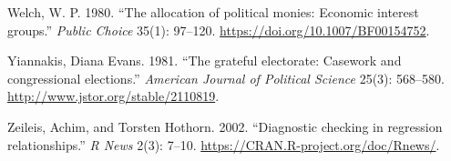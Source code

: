 \documentclass[12pt,]{article}
\begin{document}
\begin{CSLReferences}{1}{0}
\leavevmode{}%
Welch, W. P. 1980. {``The allocation of political monies: Economic
interest groups.''} \emph{Public Choice} 35(1): 97--120.
\url{https://doi.org/10.1007/BF00154752}.

\leavevmode{}%
Yiannakis, Diana Evans. 1981. {``The grateful electorate: Casework and
congressional elections.''} \emph{American Journal of Political Science}
25(3): 568--580. \url{http://www.jstor.org/stable/2110819}.

\leavevmode{}%
Zeileis, Achim, and Torsten Hothorn. 2002. {``Diagnostic checking in
regression relationships.''} \emph{R News} 2(3): 7--10.
\url{https://CRAN.R-project.org/doc/Rnews/}.

\end{CSLReferences}





\newpage
\singlespacing 
\end{document}
